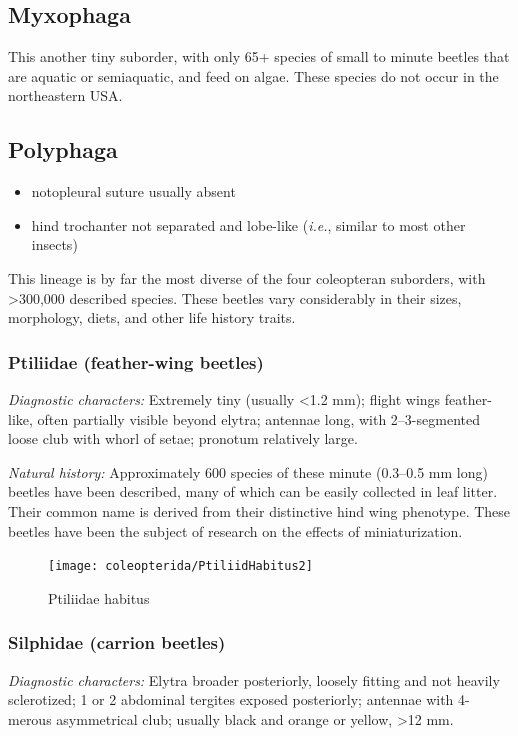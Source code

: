 \subsection{Myxophaga}
This another tiny suborder, with only 65+ species of small to minute beetles that are aquatic or semiaquatic, and feed on algae. These species do not occur in the northeastern USA.

\subsection{Polyphaga}
\begin{itemize}
\item notopleural suture usually absent
\item hind trochanter not separated and lobe-like (\textit{i.e.}, similar to most other insects) 
\end{itemize}
This lineage is by far the most diverse of the four coleopteran suborders, with \textgreater300,000 described species. These beetles vary considerably in their sizes, morphology, diets, and other life history traits.

\subsubsection{Ptiliidae (feather-wing beetles)}
\noindent{}\textit{Diagnostic characters:} Extremely tiny (usually \textless1.2 mm); flight wings feather-like, often partially visible beyond elytra; antennae long, with 2--3-segmented loose club with whorl of setae; pronotum relatively large.\vspace{3mm}

\noindent{}\textit{Natural history:} Approximately 600 species of these minute (0.3--0.5 mm long) beetles have been described, many of which can be easily collected in leaf litter. Their common name is derived from their distinctive hind wing phenotype. These beetles have been the subject of research on the effects of miniaturization.

\begin{figure}[ht!]
  \centering
    \texttt{[image: coleopterida/PtiliidHabitus2]}
  \caption{Ptiliidae habitus \citep[Modified from Fig. 17 in][]{reitter1908fauna}}
  \label{fig:ptiliids}
\end{figure}

\subsubsection{Silphidae (carrion beetles)}
\noindent{}\textit{Diagnostic characters:} Elytra broader posteriorly, loosely fitting and not heavily sclerotized; 1 or 2 abdominal tergites exposed posteriorly; antennae with 4-merous asymmetrical club; usually black and orange or yellow, \textgreater12 mm.\vspace{3mm}

